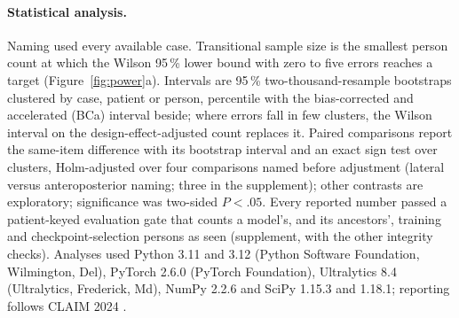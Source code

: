 \paragraph{Statistical analysis.}
Naming used every available case. Transitional sample size is the smallest person count at which the Wilson
95\,\% lower bound with zero to five errors reaches a target (Figure~\ref{fig:power}a). Intervals are 95\,\% two-thousand-resample bootstraps clustered by case,
patient or person, percentile with the bias-corrected and accelerated (BCa) interval beside; where errors fall in
few clusters, the Wilson interval on the design-effect-adjusted count replaces it. Paired comparisons report the same-item difference with its bootstrap interval and an exact
sign test over clusters, Holm-adjusted over four comparisons named before adjustment (lateral versus
anteroposterior naming; three in the supplement); other contrasts are exploratory; significance was two-sided
$P<.05$. Every reported number passed a patient-keyed evaluation gate
that counts a model's, and its ancestors', training and checkpoint-selection persons as seen (supplement, with
the other integrity checks). Analyses used Python 3.11 and 3.12 (Python Software Foundation,
Wilmington, Del), PyTorch 2.6.0 (PyTorch Foundation), Ultralytics 8.4 (Ultralytics, Frederick, Md), NumPy 2.2.6
and SciPy 1.15.3 and 1.18.1; reporting follows CLAIM 2024 \citep{claim2024}.
